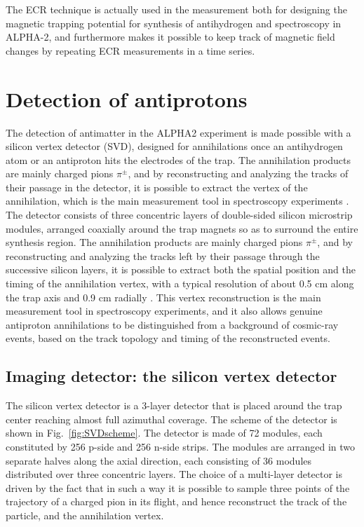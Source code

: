 The ECR technique is actually used in the measurement both for designing the magnetic trapping potential for synthesis of antihydrogen and spectroscopy in ALPHA-2, and furthermore makes it possible to keep track of magnetic field changes by repeating ECR measurements in a time series.


\section{Detection of antiprotons}

The detection of antimatter in the ALPHA2 experiment is made possible with a silicon vertex detector (SVD), designed for annihilations once an antihydrogen atom or an antiproton hits the electrodes of the trap. The annihilation products are mainly charged pions $\pi^{\pm}$, and by reconstructing and analyzing the tracks of their passage in the detector, it is possible to extract the vertex of the annihilation, which is the main measurement tool in spectroscopy experiments \cite{ALPHA:2012wlk}.
The detector consists of three concentric layers of double-sided silicon microstrip modules, arranged coaxially around the trap magnets so as to surround the entire synthesis region. The annihilation products are mainly charged pions $\pi^{\pm}$, and by reconstructing and analyzing the tracks left by their passage through the successive silicon layers, it is possible to extract both the spatial position and the timing of the annihilation vertex, with a typical resolution of about 0.5 cm along the trap axis and 0.9 cm radially \cite{Capra:2015ozr}. This vertex reconstruction is the main measurement tool in spectroscopy experiments, and it also allows genuine antiproton annihilations to be distinguished from a background of cosmic-ray events, based on the track topology and timing of the reconstructed events.

\subsection{Imaging detector: the silicon vertex detector}

The silicon vertex detector is a 3-layer detector that is placed around the trap center reaching almost full azimuthal coverage. The scheme of the detector is shown in Fig.~\ref{fig:SVDscheme}. The detector is made of 72 modules, each constituted by 256 p-side and 256 n-side strips. The modules are arranged in two separate halves along the axial direction, each consisting of 36 modules distributed over three concentric layers. The choice of a multi-layer detector is driven by the fact that in such a way it is possible to sample three points of the trajectory of a charged pion in its flight, and hence reconstruct the track of the particle, and the annihilation vertex.

